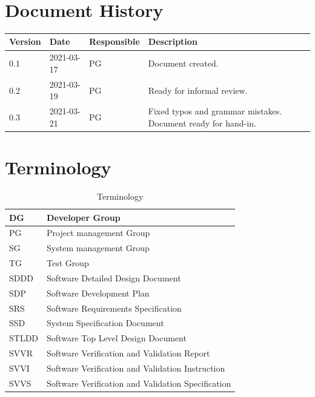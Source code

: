 \documentclass{article}
\date {#1}
\title {
    \documentNumber {08}
    \documentVersion {0.3}
    \documentTitle {Project Final Report}
    \documentGroup {2}
    \documentResponsible {Project Management Group}
    \documentAuthors {Project Management Group}
    \documentDate {2021-03-21}
}
\begin{document}
\maketitle
\thispagestyle{empty}

\newpage

\tableofcontents

\newpage

\section{Document History}
\begin{tabular}{ l | l | l | l }
    Version & Date & Responsible & Description \\
    \hline
    0.1 & 2021-03-17 & PG & Document created. \\
    \hline
    0.2 & 2021-03-19 & PG & Ready for informal review. \\
    \hline
    0.3 & 2021-03-21 & PG & Fixed typos and grammar mistakes. Document ready for hand-in. \\
\end{tabular}

\section{Terminology}
    \begin{table}[h]
        \centering
        \begin{tabular}{| l | l |}
            \hline
                DG & Developer Group \\
            \hline
                PG & Project management Group \\
            \hline
                SG & System management Group \\
            \hline
                TG & Test Group \\
            \hline
                SDDD & Software Detailed Design Document \\
            \hline 
                SDP & Software Development Plan \\
            \hline
                SRS & Software Requirements Specification \\
            \hline
                SSD & System Specification Document \\
            \hline
                STLDD & Software Top Level Design Document \\
            \hline
                SVVR & Software Verification and Validation Report \\
            \hline
                SVVI & Software Verification and Validation Instruction \\
            \hline
                SVVS & Software Verification and Validation Specification \\
            \hline
        \end{tabular}
        \caption{Terminology}
        \label{Terminology}
    \end{table}
\end{document}

